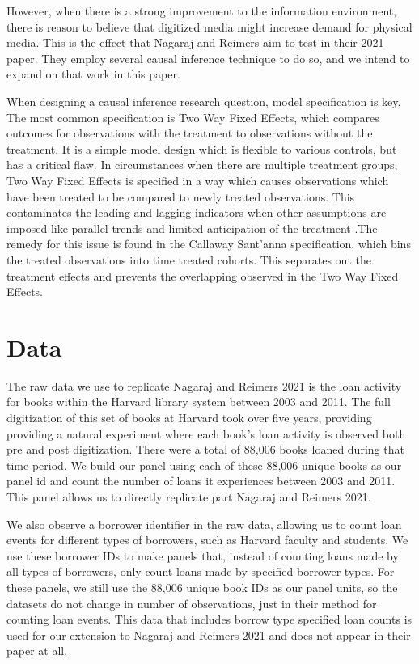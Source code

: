 \documentclass{article}
\begin{document}
However, when there is a strong improvement to the information environment, there is reason to believe that digitized media might increase demand for physical media. This is the effect that Nagaraj and Reimers aim to test in their 2021 paper. They employ several causal inference technique to do so, and we intend to expand on that work in this paper. 

When designing a causal inference research question, model specification is key. The most common specification is Two Way Fixed Effects, which compares outcomes for observations with the treatment to observations without the treatment. It is a simple model design which is flexible to various controls, but has a critical flaw. In circumstances when there are multiple treatment groups, Two Way Fixed Effects is specified in a way which causes observations which have been treated to be compared to newly treated observations. This contaminates the leading and lagging indicators when other assumptions are imposed like parallel trends and limited anticipation of the treatment \cite{sun2021estimating}.The remedy for this issue is found in the Callaway Sant'anna \cite{callaway2021difference} specification, which bins the treated observations into time treated cohorts. This separates out the treatment effects and prevents the overlapping observed in the Two Way Fixed Effects. 

\section{Data}
The raw data we use to replicate Nagaraj and Reimers 2021 is the loan activity for books within the Harvard library system between 2003 and 2011. The full digitization of this set of books at Harvard took over five years, providing providing a natural experiment where each book's loan activity is observed both pre and post digitization. There were a total of 88,006 books loaned during that time period. We build our panel using each of these 88,006 unique books as our panel id and count the number of loans it experiences between 2003 and 2011. This panel allows us to directly replicate part Nagaraj and Reimers 2021. 

We also observe a borrower identifier in the raw data, allowing us to count loan events for different types of borrowers, such as Harvard faculty and students. We use these borrower IDs to make panels that, instead of counting loans made by all types of borrowers, only count loans made by specified borrower types. For these panels, we still use the 88,006 unique book IDs as our panel units, so the datasets do not change in number of observations, just in their method for counting loan events. This data that includes borrow type specified loan counts is used for our extension to Nagaraj and Reimers 2021 and does not appear in their paper at all. 
\end{document}
